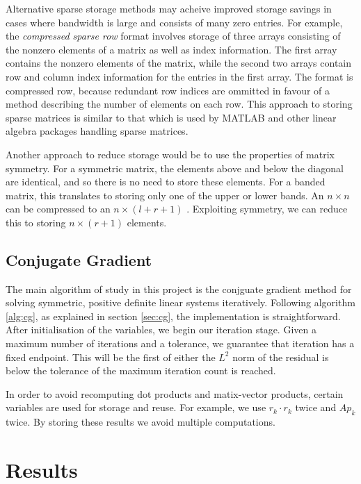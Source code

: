 Alternative sparse storage methods may acheive improved storage savings in cases where bandwidth is large and consists of many zero entries.
For example, the \textit{compressed sparse row} format involves storage of three arrays consisting of the nonzero elements of a matrix as well as index information.
The first array contains the nonzero elements of the matrix, while the second two arrays contain row and column index information for the entries in the first array.
The format is compressed row, because redundant row indices are ommitted in favour of a method describing the number of elements on each row.
This approach to storing sparse matrices is similar to that which is used by MATLAB and other linear algebra packages handling sparse matrices.

Another approach to reduce storage would be to use the properties of matrix symmetry. 
For a symmetric matrix, the elements above and below the diagonal are identical, and so there is no need to store these elements.
For a banded matrix, this translates to storing only one of the upper or lower bands.
An $n\times n$  can be compressed to an $n \times (l+r+1)$ .
Exploiting symmetry, we can reduce this to storing $n \times (r+1)$ elements.


\subsection{Conjugate Gradient}

The main algorithm of study in this project is the conjguate gradient method for solving symmetric, positive definite linear systems iteratively.
Following algorithm \ref{alg:cg}, as explained in section \ref{sec:cg}, the implementation is straightforward.
After initialisation of the variables, we begin our iteration stage. 
Given a maximum number of iterations and a tolerance, we guarantee that iteration has a fixed endpoint.
This will be the first of either the $L^{2}$ norm of the residual is below the tolerance of the maximum iteration count is reached.

In order to avoid recomputing dot products and matix-vector products, certain variables are used for storage and reuse.
For example, we use $r_k \cdot r_k$ twice and $A p_k$ twice. By storing these results we avoid multiple computations.


\section{Results}

